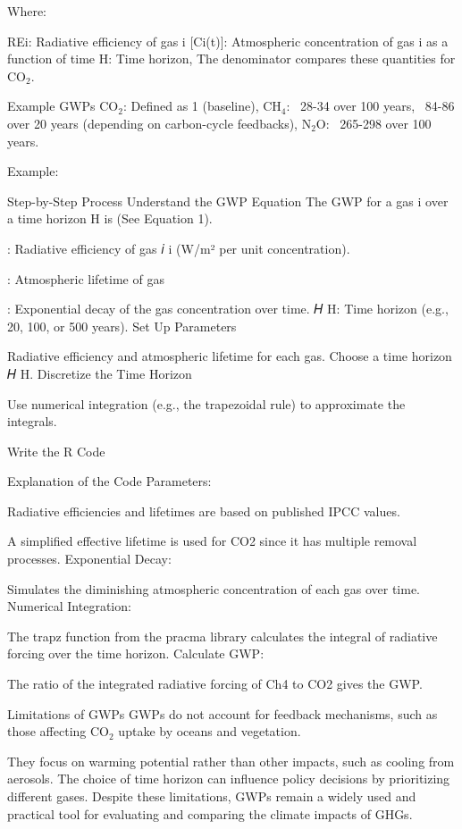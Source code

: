 \documentclass{tufte-handout}\usepackage[]{graphicx}\usepackage[]{xcolor}
\begin{document}
Where: 

REi: Radiative efficiency of gas i
[Ci(t)]: Atmospheric concentration of gas i as a function of time
H: Time horizon,
The denominator compares these quantities for CO$_2$.


Example GWPs
CO$_2$: Defined as 1 (baseline),
CH$_4$: ~28-34 over 100 years, ~84-86 over 20 years (depending on carbon-cycle feedbacks),
N$_2$O: ~265-298 over 100 years.\


Example: 

Step-by-Step Process
Understand the GWP Equation The GWP for a gas i over a time horizon
H is (See Equation 1).



 : Radiative efficiency of gas 
𝑖
i (W/m² per unit concentration).

 : Atmospheric lifetime of gas 

 : Exponential decay of the gas concentration over time.
𝐻
H: Time horizon (e.g., 20, 100, or 500 years).
Set Up Parameters

Radiative efficiency and atmospheric lifetime for each gas.
Choose a time horizon 
𝐻
H.
Discretize the Time Horizon

Use numerical integration (e.g., the trapezoidal rule) to approximate the integrals.

Write the R Code


Explanation of the Code
Parameters:

Radiative efficiencies and lifetimes are based on published IPCC values.

A simplified effective lifetime is used for CO2 since it has multiple removal processes.
Exponential Decay:

Simulates the diminishing atmospheric concentration of each gas over time.
Numerical Integration:

The trapz function from the pracma library calculates the integral of radiative forcing over the time horizon.
Calculate GWP:

The ratio of the integrated radiative forcing of Ch4 to CO2 gives the GWP.


Limitations of GWPs
GWPs do not account for feedback mechanisms, such as those affecting CO$_2$ uptake by oceans and vegetation.


They focus on warming potential rather than other impacts, such as cooling from aerosols.
The choice of time horizon can influence policy decisions by prioritizing different gases.
Despite these limitations, GWPs remain a widely used and practical tool for evaluating and comparing the climate impacts of GHGs.
\end{document}

